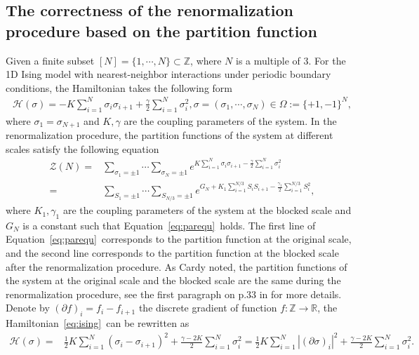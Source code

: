 \documentclass[11pt]{article}
\numberwithin{equation}{section}%
\numberwithin{figure}{section}%
\theoremstyle{remark}
\begin{document}
\subsection{The correctness of the renormalization procedure based on the partition function}\label{sec:6.1}
 Given a finite subset $[N]=\{1,\cdots,N\}\subset\mathbb{Z}$, where $ N$ is a multiple of 3. For the 1D Ising model with nearest-neighbor interactions under periodic boundary conditions, the Hamiltonian takes the following form
 \begin{align}\label{eq:ising}
 \mathcal{H}(\sigma)=-K\sum_{i=1}^{N}\sigma_{i}\sigma_{i+1}+\frac{\gamma}{2}\sum_{i=1}^{N}\sigma^{2}_{i},  \sigma=(\sigma_{1},\cdots,\sigma_{N})\in\Omega:=\{+1,-1\}^{N},
 \end{align}	
 where $\sigma_{1}=\sigma_{N+1}$ and $K,\gamma$ are the coupling parameters of the system. In the renormalization procedure, the partition functions of the system at different scales satisfy the following equation
		\begin{equation}\label{eq:parequ}
			\begin{split}
		\mathcal{Z}(N)=&\sum_{\sigma_{1}=\pm1}\cdots\sum_{\sigma_{N}=\pm1}e^{ K\sum_{i=1}^{N}\sigma_{i}\sigma_{i+1}-\frac{\gamma}{2}\sum_{i=1}^{N}\sigma_{i}^{2}}\\
		=&\sum_{S_{1}=\pm1}\cdots\sum_{S_{N/3}=\pm1}e^{G_{N}+ K_{1}\sum_{i=1}^{N/3}S_{i}S_{i+1}-\frac{\gamma_{1}}{2}\sum_{i=1}^{N/3}S_{i}^{2}},
		\end{split}
	\end{equation}
	where $K_{1},\gamma_{1}$ are the coupling parameters of the system at the blocked scale and $G_{N}$ is a constant such that Equation~\eqref{eq:parequ}~holds. The first line of Equation~\eqref{eq:parequ}~corresponds to the partition function at the original scale, and the second line corresponds to the partition function at the blocked scale after the renormalization procedure. As Cardy noted, the partition functions of the system at the original scale and the blocked scale are the same during the renormalization procedure, see the first paragraph on p.33 in \cite{Cardy1996book} for more details. Denote by $(\partial f)_{i}=f_{i}-f_{i+1}$ the discrete gradient of function $f:\mathbb{Z}\rightarrow \mathbb{R}$, the Hamiltonian~\eqref{eq:ising}~can be rewritten as
	\begin{equation}\label{eq:discreteham}
		\begin{split}
			\mathcal{H}(\sigma)
			=&\frac{1}{2}K\sum_{i=1}^{N}\left(\sigma_{i}-\sigma_{i+1}\right)^{2}+\frac{\gamma-2K}{2}\sum_{i=1}^{N}\sigma^{2}_{i}
			=\frac{1}{2}K\sum_{i=1}^{N}\left|(\partial \sigma)_{i}\right|^{2}+\frac{\gamma-2K}{2}\sum_{i=1}^{N}\sigma^{2}_{i}.
		\end{split}
	\end{equation} 
\end{document}
